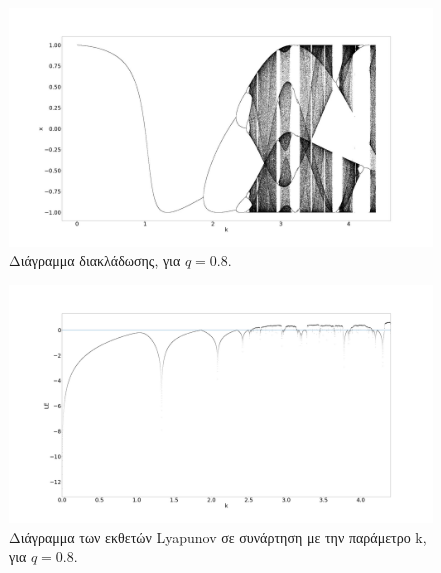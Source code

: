 \begin{figure}[ht]
	\centering
	\includegraphics[width=1\linewidth]{LateX images/cheb q=0.8/g1}
	\caption{Διάγραμμα διακλάδωσης, για $q=0.8$.}
	\label{f:g59}
\end{figure}


\begin{figure}[ht]
	\centering
	\includegraphics[width=1\linewidth]{LateX images/cheb q=0.8/g2}
	\caption{Διάγραμμα των εκθετών Lyapunov σε συνάρτηση με την παράμετρο k, για $q=0.8$.}
	\label{f:g60}
\end{figure}


